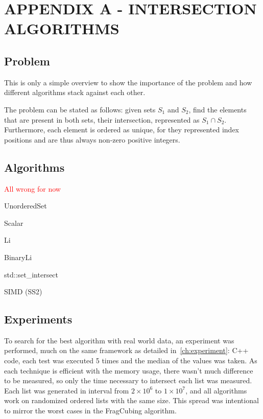 
\hypertarget{appendix:a}{} %
\renewcommand{\thechapter}{}%
\chapter{APPENDIX A - INTERSECTION ALGORITHMS}
\label{ap:a}
\renewcommand{\thechapter}{A}

\section{Problem}\label{ap:a:problem}

This is only a simple overview to show the importance of the problem and how different algorithms stack against each other.

The problem can be stated as follows: given sets $S_1$ and $S_2$, find the elements that are present in both sets, their intersection, represented as $S_1 \cap S_2$.
Furthermore, each element is ordered as unique, for they represented index positions and are thus always non-zero positive integers.

\section{Algorithms}\label{ap:a:algos}

\textcolor{red}{All wrong for now}

UnorderedSet

Scalar

Li

BinaryLi

std::set\_intersect

SIMD (SS2)


\section{Experiments}\label{ap:a:results}

To search for the best algorithm with real world data, an experiment was performed, much on the same framework as detailed in~\ref{ch:experiment}: C++ code, each test was executed 5 times and the median of the values was taken.
As each technique is efficient with the memory usage, there wasn't much difference to be measured, so only the time necessary to intersect each list was measured.
Each list was generated in interval from $2\times10^6$ to $1\times10^7$, and all algorithms work on randomized ordered lists with the same size.
This spread was intentional to mirror the worst cases in the FragCubing algorithm.

